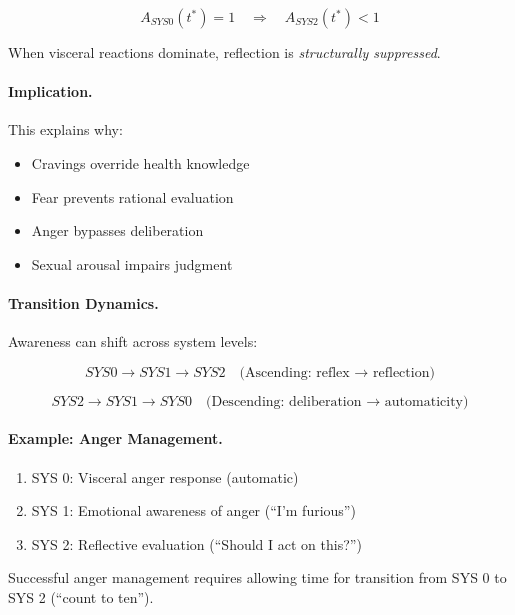 \begin{equation}
\boxed{A_{SYS0}(t^*) = 1 \quad \Rightarrow \quad A_{SYS2}(t^*) < 1}
\label{eq:hyper-dissonance}
\end{equation}

When visceral reactions dominate, reflection is \emph{structurally suppressed}.

\paragraph{Implication.}
This explains why:
\begin{itemize}
\item Cravings override health knowledge
\item Fear prevents rational evaluation
\item Anger bypasses deliberation
\item Sexual arousal impairs judgment
\end{itemize}

\paragraph{Transition Dynamics.}
Awareness can shift across system levels:

\begin{equation}
SYS0 \rightarrow SYS1 \rightarrow SYS2 \quad \text{(Ascending: reflex → reflection)}
\end{equation}

\begin{equation}
SYS2 \rightarrow SYS1 \rightarrow SYS0 \quad \text{(Descending: deliberation → automaticity)}
\end{equation}

\paragraph{Example: Anger Management.}
\begin{enumerate}
\item SYS 0: Visceral anger response (automatic)
\item SYS 1: Emotional awareness of anger (``I'm furious'')
\item SYS 2: Reflective evaluation (``Should I act on this?'')
\end{enumerate}

Successful anger management requires allowing time for transition from 
SYS 0 to SYS 2 (``count to ten'').

